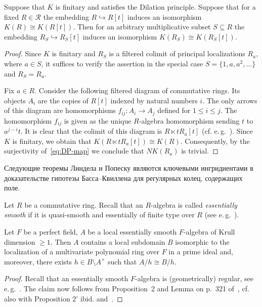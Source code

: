 \documentclass[oneside, 11pt]{amsart} \pdfoutput=1
\begin{document}
\begin{lemma} \label{HIL} Suppose that $K$ is finitary and satisfies the Dilation principle. Suppose that for a fixed $R \in \mathcal{R}$ the embedding $R \hookrightarrow R[t]$ induces an isomorphism $K(R) \cong K(R[t])$. Then for an arbitrary multiplicative subset $S \subseteq R$ the embedding $R_S \hookrightarrow R_S[t]$ induces an isomorphism $K(R_S)\cong K(R_S[t]).$
\end{lemma}
\begin{proof}
 Since $K$ is finitary and $R_S$ is a filtered colimit of principal localizations $R_a$, where $a\in S$, it suffices to verify the assertion in the special case $S = \{ 1, a, a^2, \ldots \}$ and $R_S = R_a$.
 
 Fix $a \in R$. Consider the following filtered diagram of commutative rings. Its objects $A_i$ are the copies of $R[t]$ indexed by natural numbers $i$. The only arrows of this diagram are homomorphisms $f_{ij}\colon A_i \to A_j$  defined for $1 \leq i \leq j$. The homomorphism $f_{ij}$ is given as the unique $R$-algebra homomorphism sending $t$ to $a^{j-i}t$. It is clear that the colimit of this diagram is $R \ltimes tR_a[t]$ (cf. e.\,g.~\cite[Lemma~15]{S15}). 
 Since $K$ is finitary, we obtain that $K(R \ltimes tR_a[t]) \cong K(R)$. Consequently, by the surjectivity of~\eqref{eq:DP-map} we conclude that $NK(R_a)$ is trivial.
\end{proof}


Следующие теоремы Линдела и Попеску являются ключевыми ингридиентами в доказательстве гипотезы Басса--Квиллена для регулярных колец, содержащих поле. 

Let $R$ be a commutative ring. Recall that an $R$-algebra is called {\it essentially smooth} if it is quasi-smooth and essentially of finite type over $R$ (see e.\,g.~\cite[p.~136]{Sw98}).
\begin{theorem}[Lindel] \label{lindel}
Let $F$ be a perfect field, $A$ be a local essentially smooth $F$-algebra of Krull dimension $\geq 1$.
Then $A$ contains a local subdomain $B$ isomorphic to the localization of a multivariate polynomial ring over $F$ in a prime ideal and, moreover, there exists $h\in B\setminus A^\times$ such that $A/h \cong B/h$. 
\end{theorem}
\begin{proof} Recall that an essentially smooth $F$-algebra is (geometrically) regular, see e.\,g.~\cite[p.~137]{Sw98}. The claim now follows from Proposition~2 and Lemma on p.~321 of~\cite{Li81}, cf. also with Proposition 2' ibid. and~\cite[Proposition~3.2]{Vo81}. %
\end{proof}
\end{document}
